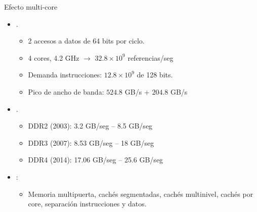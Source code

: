 \begin{frame}[t]{Efecto multi-core}
\begin{itemize}
  \item {}.
    \begin{itemize}
      \item 2 accesos a datos de 64 bits por ciclo.
      \item 4 cores, 4.2 GHz $\rightarrow$ $32.8 \times 10^9$ referencias/seg
      \item Demanda instrucciones: $12.8 \times 10^9$ de 128 bits.
      \item Pico de ancho de banda: $524.8$ GB/s + $204.8$ GB/s
    \end{itemize}

  \item {}.
    \begin{itemize}
      \item DDR2 (2003): 3.2 GB/seg – 8.5 GB/seg
      \item DDR3 (2007):  8.53 GB/seg – 18 GB/seg
      \item DDR4 (2014): 17.06 GB/seg – 25.6 GB/seg
    \end{itemize}

  \item {}:
    \begin{itemize}
      \item Memoria multipuerta, cachés segmentadas, cachés multinivel, 
            cachés por core, separación instrucciones y datos.
    \end{itemize}

\end{itemize}
\end{frame}

